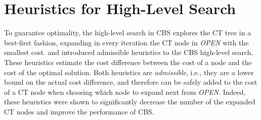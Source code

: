 \documentclass[letterpaper]{article} %
\newcommand\konstantin[1]{\nb{\textbf{Konstantin:}}{red}{#1}}
\newcommand{\cbs}{\ac{CBS}\xspace}
\newcommand{\cbsh}{{CBS-H}\xspace}
\newcommand{\ct}{\ac{CT}\xspace}
\newcommand{\soc}{\ac{SOC}\xspace}
\newcommand{\astar}{A$^*$\xspace}
\newcommand{\mapf}{\ac{MAPF}\xspace}
\newcommand{\open}{\textit{OPEN}\xspace}
\begin{document}


\section{Heuristics for High-Level Search}




To guarantee optimality, the high-level search in \cbs explores the \ct tree in a best-first fashion, expanding in every iteration the \ct node in \open with the smallest cost. %
\citet{felner2018adding} and \citet{CBSH2} introduced admissible heuristics to the \cbs high-level search.
These heuristics estimate the cost difference between the cost of a node and the cost of the optimal solution. Both heuristics are \emph{admissible}, i.e., they are a lower bound on the actual cost difference, and therefore can be safely added to the cost of a \ct node when choosing which node to expand next from \open.
Indeed, these heuristics were shown to significantly decrease the number of the expanded \ct nodes and improve the performance of \cbs.
\end{document}
